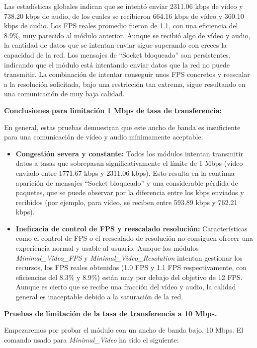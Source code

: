 Las estadísticas globales indican que se intentó enviar 2311.06 kbps de vídeo y 738.20 kbps de audio, de los cuales se recibieron 664.16 kbps de vídeo y 360.10 kbps de audio. Los FPS reales promedio fueron de 1.1, con una eficiencia del 8.9\%, muy parecido al módulo anterior. Aunque se recibió algo de vídeo y audio, la cantidad de datos que se intentan enviar sigue superando con creces la capacidad de la red. Los mensajes de ``Socket bloqueado'' son persistentes, indicando que el módulo está intentando enviar datos que la red no puede transmitir. La combinación de intentar conseguir unos FPS concretos y reescalar a la resolución solicitada, bajo una restricción tan extrema, sigue resultando en una comunicación de muy baja calidad.

\textbf{Conclusiones para limitación 1 Mbps de tasa de transferencia:}

En general, estas pruebas demuestran que este ancho de banda es insuficiente para una comunicación de vídeo y audio mínimamente aceptable.
\begin{itemize}
\item \textbf{Congestión severa y constante:} Todos los módulos intentan transmitir datos a tasas que sobrepasan significativamente el límite de 1 Mbps (vídeo enviado entre 1771.67 kbps y 2311.06 kbps). Esto resulta en la continua aparición de mensajes ``Socket bloqueado'' y una considerable pérdida de paquetes, que se puede observar por la diferencia entre los kbps enviados y recibidos (por ejemplo, para vídeo, se reciben entre 593.89 kbps y 762.21 kbps).
\item \textbf{Ineficacia de control de FPS y reescalado resolución:} Características como el control de FPS o el reescalado de resolución no consiguen ofrecer una experiencia normal y usable al usuario. Aunque los módulos \textit{Minimal\_Video\_FPS} y \textit{Minimal\_Video\_Resolution} intentan gestionar los recursos, los FPS reales obtenidos (1.0 FPS y 1.1 FPS respectivamente, con eficiencias del 8.3\% y 8.9\%) están muy por debajo del objetivo de 12 FPS. Aunque es cierto que se recibe una fracción del vídeo y audio, la calidad general es inaceptable debido a la saturación de la red.
\end{itemize}

\newpage

\textbf{Pruebas de limitación de la tasa de transferencia a 10 Mbps.}
\vspace{\baselineskip}

Empezaremos por probar el módulo con un ancho de banda bajo, 10 Mbps. El comando usado para \textit{Minimal\_Video} ha sido el siguiente:

